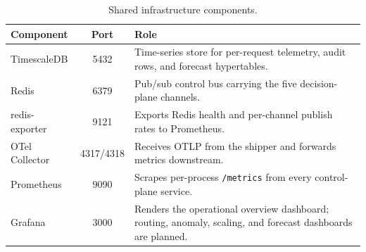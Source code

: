 \begin{table}[htbp]
  \centering
  \caption[Shared infrastructure components]{Shared infrastructure components.}
  \label{bm:tab-infra}
  \small
  \begin{tabularx}{\linewidth}{@{}l c Y@{}}
    \toprule
    \textbf{Component} & \textbf{Port} & \textbf{Role} \\
    \midrule
    TimescaleDB \cite{timescaledb} & 5432 & Time-series store for per-request telemetry, audit rows, and forecast hypertables. \\
    Redis \cite{carlson2013redis}  & 6379 & Pub/sub control bus carrying the five decision-plane channels. \\
    redis-exporter                 & 9121 & Exports Redis health and per-channel publish rates to Prometheus. \\
    OTel Collector \cite{opentelemetry} & 4317/4318 & Receives OTLP from the shipper and forwards metrics downstream. \\
    Prometheus \cite{prometheus}   & 9090 & Scrapes per-process \texttt{/metrics} from every control-plane service. \\
    Grafana \cite{grafana}         & 3000 & Renders the operational overview dashboard; routing, anomaly, scaling, and forecast dashboards are planned. \\
    \bottomrule
  \end{tabularx}
\end{table}

